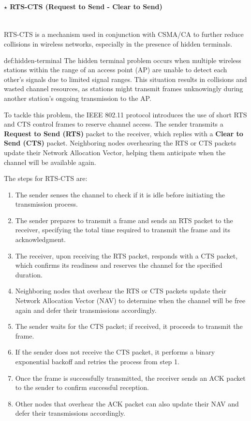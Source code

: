 \paragraph[5.3.2.5 RTS-CTS (Request to Send - Clear to Send)]{$\pmb{\star}$ RTS-CTS (Request to Send - Clear to Send)}\mbox{}\\[4pt]
RTS-CTS is a mechanism used in conjunction with CSMA/CA to further reduce collisions in wireless networks, especially in the presence of hidden terminals. 

\begin{theo}{def:hidden-terminal}\label{def:hidden-terminal}
    The hidden terminal problem occurs when multiple wireless stations within the range of an access point (AP) are unable to detect each other's signals due to limited signal ranges. This situation results in collisions and wasted channel resources, as stations might transmit frames unknowingly during another station's ongoing transmission to the AP.
    
    To tackle this problem, the IEEE 802.11 protocol introduces the use of short RTS and CTS control frames to reserve channel access. The sender transmits a \textbf{Request to Send (RTS)} packet to the receiver, which replies with a \textbf{Clear to Send (CTS)} packet. Neighboring nodes overhearing the RTS or CTS packets update their Network Allocation Vector, helping them anticipate when the channel will be available again.
\end{theo}

\noindent The steps for RTS-CTS are:
\begin{enumerate}
    \item The sender senses the channel to check if it is idle before initiating the transmission process.
    \item The sender prepares to transmit a frame and sends an RTS packet to the receiver, specifying the total time required to transmit the frame and its acknowledgment.
    \item The receiver, upon receiving the RTS packet, responds with a CTS packet, which confirms its readiness and reserves the channel for the specified duration.
    \item Neighboring nodes that overhear the RTS or CTS packets update their Network Allocation Vector (NAV) to determine when the channel will be free again and defer their transmissions accordingly.
    \item The sender waits for the CTS packet; if received, it proceeds to transmit the frame.
    \item If the sender does not receive the CTS packet, it performs a binary exponential backoff and retries the process from step 1.
    \item Once the frame is successfully transmitted, the receiver sends an ACK packet to the sender to confirm successful reception.
    \item Other nodes that overhear the ACK packet can also update their NAV and defer their transmissions accordingly.
\end{enumerate}

